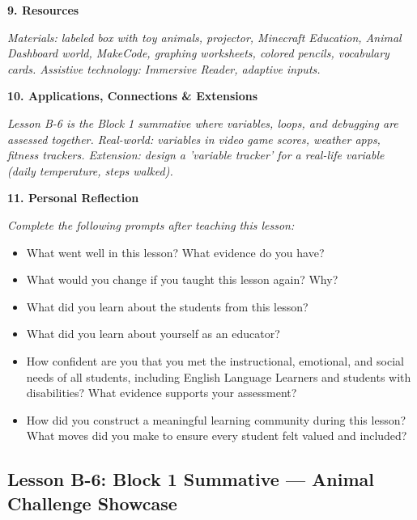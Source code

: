 \documentclass[11pt,letterpaper]{article}
\begin{document}
\textbf{9. Resources}

\textit{Materials: labeled box with toy animals, projector, Minecraft Education, Animal Dashboard world, MakeCode, graphing worksheets, colored pencils, vocabulary cards. Assistive technology: Immersive Reader, adaptive inputs.}

\textbf{10. Applications, Connections \& Extensions}

\textit{Lesson B-6 is the Block 1 summative where variables, loops, and debugging are assessed together. Real-world: variables in video game scores, weather apps, fitness trackers. Extension: design a 'variable tracker' for a real-life variable (daily temperature, steps walked).}

\textbf{11. Personal Reflection}

\textit{Complete the following prompts after teaching this lesson:}

\begin{itemize}
  \item What went well in this lesson? What evidence do you have?

  \item What would you change if you taught this lesson again? Why?

  \item What did you learn about the students from this lesson?

  \item What did you learn about yourself as an educator?

  \item How confident are you that you met the instructional, emotional, and social needs of all students, including English Language Learners and students with disabilities? What evidence supports your assessment?

  \item How did you construct a meaningful learning community during this lesson? What moves did you make to ensure every student felt valued and included?
\end{itemize}

\newpage
\subsection{Lesson B-6: Block 1 Summative --- Animal Challenge Showcase}
\label{sub:LessonB6Block1SummativeAnimalChallengeShowcase}
\end{document}
